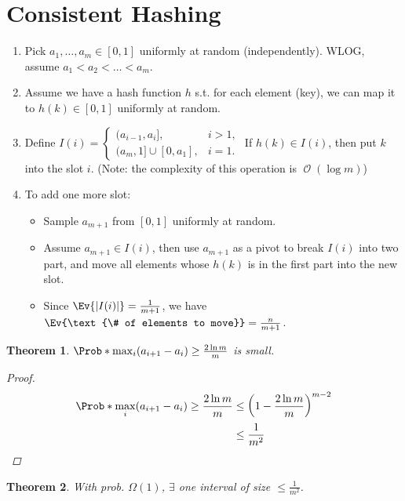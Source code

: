 \documentclass[a4paper]{article}
\DeclarePairedDelimiter{\abs}{\lvert}{\rvert}
\DeclareMathOperator{\Ord}{\mathcal{O}}
\theoremstyle{mystyle}
\newtheorem{theorem}{Theorem}
\begin{document}
\section{Consistent Hashing}
\begin{enumerate}
  \item Pick $a_1, \dots, a_m \in [0, 1]$ uniformly at random (independently).
    WLOG, assume $a_1 < a_2 < \dots < a_m$.
  \item Assume we have a hash function $h$ s.t. for each element (key),
    we can map it to $h(k) \in [0, 1]$ uniformly at random.
  \item Define $I(i) = \begin{cases}
      (a_{i-1}, a_i], & i > 1, \\
      (a_m, 1] \cup [0, a_1], & i = 1.
    \end{cases}$ If $h(k) \in I(i)$, then put $k$ into the slot $i$.
    (Note: the complexity of this operation is $\Ord(\log m)$)
  \item To add one more slot:
    \begin{itemize}
      \item Sample $a_{m+1}$ from $[0, 1]$ uniformly at random.
      \item Assume $a_{m+1} \in I(i)$, then use $a_{m+1}$ as a pivot to break
        $I(i)$ into two part, and move all elements whose $h(k)$ is in the
        first part into the new slot.
      \item Since $\Ev{\abs{I(i)}} = \frac{1}{m+1}$, we have
        $\Ev{\text{\#  of elements to move}} = \frac{n}{m+1}$.
    \end{itemize}
\end{enumerate}

\begin{theorem}
  $\Prob*{\max_i (a_{i+1} - a_i) \ge \frac{2 \ln m}{m}}$ is small.
  \begin{proof}
    \begin{align*}
      \Prob*{\max_i (a_{i+1} - a_i) \ge \frac{2 \ln m}{m}}
      &\le \left(1 - \frac{2 \ln m}{m}\right)^{m-2} \\
      &\le \frac{1}{m^2} \qedhere
    \end{align*}
  \end{proof}
\end{theorem}
\begin{theorem}
  With prob. $\Omega(1)$, $\exists$ one interval of size $\le \frac{1}{m^2}$.
\end{theorem}
% 
% 
\end{document}
